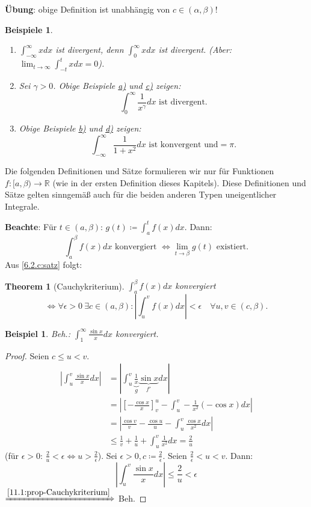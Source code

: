 \documentclass[14pt,titlepage,ngerman,a4paper,headsepline,DIV15,halfparskip*]{scrartcl}
\newcommand{\R}{\mathbb{R}}
\theoremstyle{named}
\newtheorem{namedtheorem}{Theorem} \counterwithin{namedtheorem}{section}
\theoremstyle{dotless}
\newtheorem*{beispiel*}{Beispiel}
\newtheorem*{beispiele}{Beispiele}
\begin{document}
\textbf{Übung}: obige Definition ist unabhängig von $c \in (\alpha, \beta)$!

\begin{beispiele} ~\
	\begin{enumerate}
		\item $\int_{-\infty}^{\infty} x dx$ ist divergent, denn $\int_{0}^{\infty} x dx$ ist divergent. (Aber: $\lim_{t \rightarrow \infty} \int_{-t}^{t} x dx = 0$).
		\item Sei $\gamma > 0$. Obige Beispiele \hyperref[11.0:bsp-obigeBspa]{a)} und \hyperref[11.0:bsp-obigeBspc]{c)} zeigen:
			$$ \int_{0}^{\infty} \frac{1}{x^{\gamma}} dx \text{ ist divergent.} $$
		\item Obige Beispiele \hyperref[11.0:bsp-obigeBspb]{b)} und \hyperref[11.0:bsp-obigeBspd]{d)} zeigen:
			$$ \int_{-\infty}^{\infty} \frac{1}{1 + x^{2}} dx \text{ ist konvergent und} = \pi. $$
	\end{enumerate}
\end{beispiele}

Die folgenden Definitionen und Sätze formulieren wir nur für Funktionen $f \colon [a, \beta) \rightarrow \R$ (wie in der ersten Definition dieses Kapitels). Diese Definitionen und Sätze gelten sinngemä{\ss} auch für die beiden anderen Typen uneigentlicher Integrale.

\textbf{Beachte}: Für $t \in (a, \beta)$: $g(t) \coloneqq \int_{a}^{t} f(x) dx$. Dann:
	$$ \int_{a}^{\beta} f(x) dx \text{ konvergiert } \iff \lim_{t \rightarrow \beta} g(t) \text{ existiert.} $$
Aus \ref{6.2.c:satz} folgt:

\begin{namedtheorem}[Cauchykriterium] \label{11.1:prop-Cauchykriterium}
	$\int_{a}^{\beta} f(x) dx$ konvergiert
	$$ \iff \forall \epsilon > 0 ~\exists c \in (a, \beta):  | \int_{u}^{v} f(x) dx | < \epsilon \quad \forall u, v \in (c, \beta).  $$
\end{namedtheorem}


\begin{beispiel*}
	Beh.: $\int_{1}^{\infty} \frac{\sin x}{x} dx$ konvergiert.	
\end{beispiel*}

\begin{proof}
	Seien $c \leq u < v$.
	\begin{align*}
		|\int_{u}^{v} \frac{\sin x}{x} dx | & = | \int_{u}^{v} \underbrace{\frac{1}{x}}_{g} \underbrace{\sin x}_{f'} dx | \\
			& = | \left[ -\frac{\cos x}{x} \right]_{v}^{u} - \int_{u}^{v} - \frac{1}{x^{2}} (-\cos x) dx | \\
			& = | \frac{\cos v}{v} - \frac{\cos u}{u} - \int_{u}^{v} \frac{\cos x}{x^{2}} dx | \\
			& \leq \frac{1}{v} + \frac{1}{u} + \int_{u}^{v} \frac{1}{x^{2}} dx = \frac{2}{u}
	\end{align*}
	(für $\epsilon > 0$: $\frac{2}{u} < \epsilon \iff u > \frac{2}{\epsilon}$). Sei $\epsilon > 0, c \coloneqq \frac{2}{\epsilon}$. Seien $\frac{2}{\epsilon} < u < v$. Dann:
	$$ | \int_{u}^{v} \frac{\sin x}{x} dx | \leq \frac{2}{u} < \epsilon $$
	$\xRightarrow[]{\ref{11.1:prop-Cauchykriterium}}$ Beh.
\end{proof}
\end{document}
